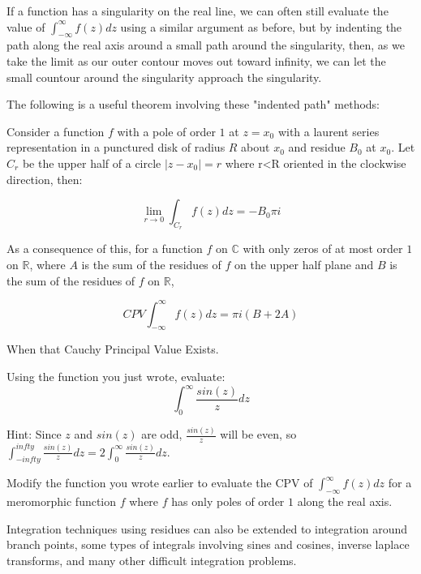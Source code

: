 If a function has a singularity on the real line, we can often still evaluate the value of $\int_{-\infty}^{\infty} f(z) dz$ using a similar argument as before, but by indenting the path along the real axis around a small path around the singularity, then, as we take the limit as our outer contour moves out toward infinity, we can let the small countour around the singularity approach the singularity.

The following is a useful theorem involving these "indented path" methods:

Consider a function $f$ with a pole of order $1$ at $z=x_0$ with a laurent series representation in a punctured disk of radius $R$ about $x_0$ and residue $B_0$ at $x_0$. Let $C_r$ be the upper half of a circle $|z-x_0|=r$ where r<R oriented in the clockwise direction, then:

$$\lim_{r\to 0} \int_{C_r} f(z) dz = - B_0 \pi i$$

As a consequence of this, for a function $f$ on $\mathbb{C}$ with only zeros of at most order $1$ on $\mathbb{R}$, where $A$ is the sum of the residues of $f$ on the upper half plane and $B$ is the sum of the residues of $f$ on $\mathbb{R}$, 

$$CPV \int_{-\infty}^{\infty} f(z) dz = \pi i (B+2A)$$ 

When that Cauchy Principal Value Exists.

\begin{problem}
Using the function you just wrote, evaluate:
$$\int_{0}^{\infty} \frac{sin(z)}{z} dz$$

Hint: Since $z$ and $sin(z)$ are odd, $\frac{sin(z)}{z}$ will be even, so 
$\int_{-infty}^{infty} \frac{sin(z)}{z} dz = 2 \int_{0}^{\infty} \frac{sin(z)}{z} dz$.
\end{problem}


\begin{problem}

Modify the function you wrote earlier to evaluate the CPV of $\int_{-\infty}^{\infty} f(z) dz$ for a meromorphic function $f$ where $f$ has only poles of order $1$ along the real axis.

\end{problem}

Integration techniques using residues can also be extended to integration around branch points, some types of integrals involving sines and cosines, inverse laplace transforms, and many other difficult integration problems.